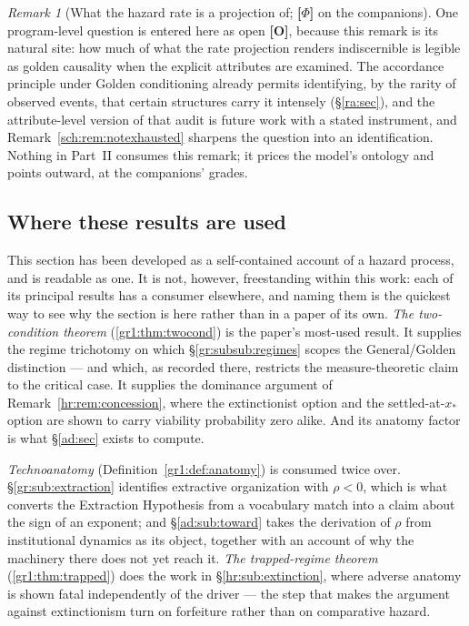\documentclass[11pt]{article}
\numberwithin{equation}{section}
\theoremstyle{plain}
\theoremstyle{definition}
\theoremstyle{remark}
\newtheorem{remark}[theorem]{Remark}
\begin{document}
\begin{remark}[What the hazard rate is a projection of; \textbf{[$\Phi$]} on the companions]
One program-level question is entered here as open \textbf{[O]},
because this remark is its natural site: how much of what the rate
projection renders indiscernible is legible as golden causality when
the explicit attributes are examined. The accordance principle under
Golden conditioning already permits identifying, by the rarity of
observed events, that certain structures carry it intensely
(\S\ref{ra:sec}), and the attribute-level version of that audit is
future work with a stated instrument, and
Remark~\ref{sch:rem:notexhausted} sharpens the question into an
identification. Nothing in Part~II consumes
this remark; it prices the model's ontology and points outward, at
the companions' grades.
\end{remark}

\subsection{Where these results are used}\label{gr1:sub:consumers}

This section has been developed as a self-contained account of a hazard
process, and is readable as one. It is not, however, freestanding within
this work: each of its principal results has a consumer elsewhere, and
naming them is the quickest way to see why the section is here rather
than in a paper of its own. \emph{The two-condition theorem} (\ref{gr1:thm:twocond}) is the paper's
most-used result. It supplies the regime trichotomy on which
\S\ref{gr:subsub:regimes} scopes the General/Golden distinction --- and
which, as recorded there, restricts the measure-theoretic claim to the
critical case. It supplies the dominance argument of
Remark~\ref{hr:rem:concession}, where the extinctionist option and the
settled-at-$x_\ast$ option are shown to carry viability probability zero
alike. And its anatomy factor is what \S\ref{ad:sec} exists to compute.

\emph{Technoanatomy} (Definition~\ref{gr1:def:anatomy}) is consumed
twice over. \S\ref{gr:sub:extraction} identifies extractive organization
with $\rho<0$, which is what converts the Extraction Hypothesis from a
vocabulary match into a claim about the sign of an exponent; and
\S\ref{ad:sub:toward} takes the derivation of $\rho$ from institutional
dynamics as its object, together with an account of why the machinery
there does not yet reach it. \emph{The trapped-regime theorem} (\ref{gr1:thm:trapped}) does the work
in \S\ref{hr:sub:extinction}, where adverse anatomy is shown fatal
independently of the driver --- the step that makes the argument against
extinctionism turn on forfeiture rather than on comparative hazard.
\end{document}
